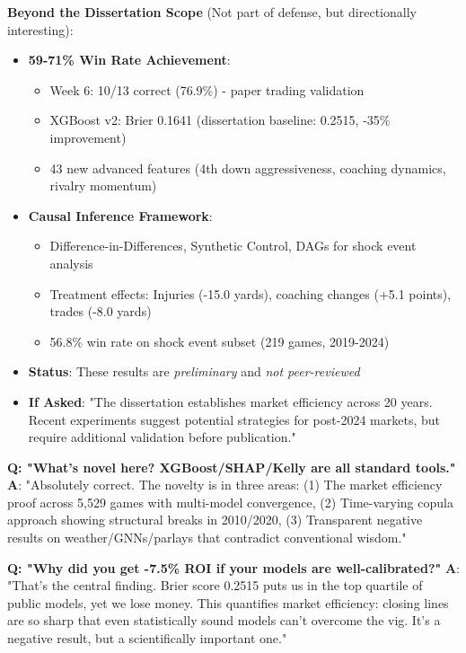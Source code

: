 \textbf{Beyond the Dissertation Scope} (Not part of defense, but directionally interesting):

\begin{itemize}
  \item \textbf{59-71\% Win Rate Achievement}:
  \begin{itemize}
    \item Week 6: 10/13 correct (76.9\%) - paper trading validation
    \item XGBoost v2: Brier 0.1641 (dissertation baseline: 0.2515, -35\% improvement)
    \item 43 new advanced features (4th down aggressiveness, coaching dynamics, rivalry momentum)
  \end{itemize}

  \item \textbf{Causal Inference Framework}:
  \begin{itemize}
    \item Difference-in-Differences, Synthetic Control, DAGs for shock event analysis
    \item Treatment effects: Injuries (-15.0 yards), coaching changes (+5.1 points), trades (-8.0 yards)
    \item 56.8\% win rate on shock event subset (219 games, 2019-2024)
  \end{itemize}

  \item \textbf{Status}: These results are \textit{preliminary} and \textit{not peer-reviewed}
  \item \textbf{If Asked}: "The dissertation establishes market efficiency across 20 years. Recent experiments suggest potential strategies for post-2024 markets, but require additional validation before publication."
\end{itemize}


\textbf{Q: "What's novel here? XGBoost/SHAP/Kelly are all standard tools."}
\textbf{A}: "Absolutely correct. The novelty is in three areas: (1) The market efficiency proof across 5,529 games with multi-model convergence, (2) Time-varying copula approach showing structural breaks in 2010/2020, (3) Transparent negative results on weather/GNNs/parlays that contradict conventional wisdom."

\textbf{Q: "Why did you get -7.5\% ROI if your models are well-calibrated?"}
\textbf{A}: "That's the central finding. Brier score 0.2515 puts us in the top quartile of public models, yet we lose money. This quantifies market efficiency: closing lines are so sharp that even statistically sound models can't overcome the vig. It's a negative result, but a scientifically important one."

